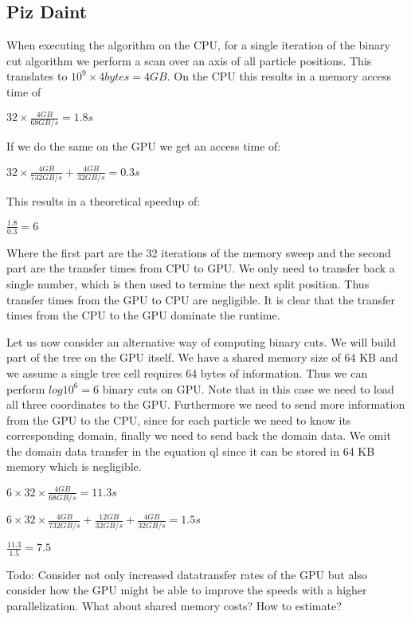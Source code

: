 \documentclass[]{article}
\begin{document}
\subsection{Piz Daint} 
When executing the algorithm on the CPU, for a single iteration of the binary cut algorithm we perform a scan over an axis of all particle positions. This translates to $10^9 \times 4 bytes = 4 GB$.
On the CPU this results in a memory access time of 
\begin{center}
	$32 \times \frac{ 4 GB}{68 GB/s} = 1.8 s$ 
\end{center}

If we do the same on the GPU we get an access time of:
\begin{center}
	$32 \times \frac{4 GB}{732 GB/s} + \frac{4 GB}{32 GB/s} = 0.3 s$ 
\end{center}

This results in a theoretical speedup of:

\begin{center}
	$\frac{1.8}{0.3} = 6$
\end{center}

Where the first part are the 32 iterations of the memory sweep and the second part are the transfer times from CPU to GPU. We only need to transfer back a single number, which is then used to termine the next split position. Thus transfer times from the GPU to CPU are negligible. It is clear that the transfer times from the CPU to the GPU dominate the runtime.

Let us now consider an alternative way of computing binary cuts. We will build part of the tree on the GPU itself. We have a shared memory size of 64 KB and we assume a single tree cell requires 64 bytes of information. Thus we can perform $log 10^6 = 6$ binary cuts on GPU. Note that in this case we need to load all three coordinates to the GPU. Furthermore we need to send more information from the GPU to the CPU, since for each particle we need to know its corresponding domain, finally we need to send back the domain data. We omit the domain data transfer in the equation ql since it can be stored in 64 KB memory which is negligible.

\begin{center}
	$6 \times 32 \times \frac{ 4 GB}{68 GB/s} = 11.3 s$ 
\end{center}

\begin{center}
	$6 \times 32 \times \frac{4 GB}{732 GB/s} + \frac{12 GB}{32 GB/s} + \frac{4 GB}{32 GB/s} = 1.5 s$ 
\end{center}

\begin{center}
	$\frac{11.3}{1.5} = 7.5$ 
\end{center}
 
Todo: Consider not only increased datatransfer rates of the GPU but also consider how the GPU might be able to improve the speeds with a higher parallelization.
What about shared memory costs? How to estimate?



\end{document}
